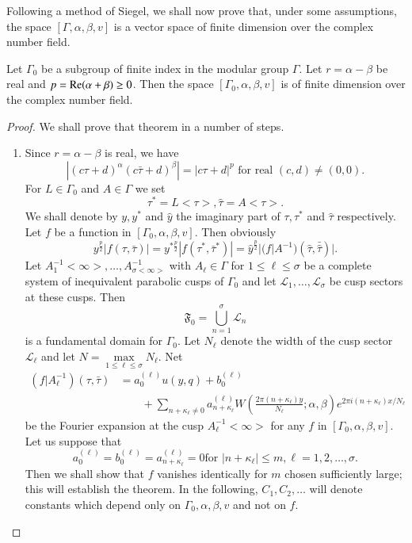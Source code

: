 Following a method of Siegel, we shall now prove that, under some
assumptions, the space $[\Gamma, \alpha, \beta, v]$ is a vector space
of finite dimension over the complex number field.

\setcounter{thm}{27}

\begin{thm}\label{chap4:thm28}
Let \pageoriginale $\Gamma_0$ be a subgroup of finite index in the
modular group $\Gamma$. Let $r=\alpha-\beta$ be real and
$p=\operatorname{Re}(\alpha+\beta)\geq 0$. Then the space $[\Gamma_0, \alpha,
  \beta,v]$ is of finite dimension over the complex number field.
\end{thm}

\begin{proof}
We shall prove that theorem in a number of steps.
\begin{enumerate}
\renewcommand{\labelenumi}{\theenumi)}
\item Since $r=\alpha-\beta$ is real, we have 
$$
|(c\tau+d)^{\alpha} (c\bar{\tau}+d)^{\beta}| = |c\tau+d|^p \text{ for
  real } (c,d) \neq (0,0).
$$
For $L\in \Gamma_0$ and $A\in \Gamma$ we set 
$$
\tau^{\ast} = L<\tau>, \hat{\tau} = A<\tau>.
$$
We shall denote by $y,y^{\ast}$ and $\hat{y}$ the imaginary part of
$\tau, \tau^{\ast}$ and $\hat{\tau}$ respectively. Let $f$ be a
function in $[\Gamma_0, \alpha, \beta, v]$. Then obviously
$$
y^{\frac{p}{2}} |f(\tau,\bar{\tau})| = y^{\ast\frac{p}{2}}
|f(\tau^{\ast}, \bar{\tau}^{\ast})| = \hat{y}^{\frac{p}{2}}
|(f|A^{-1})(\hat{\tau}, \bar{\hat{\tau}})|.
$$
Let $A^{-1}_1<\infty>, \ldots, A^{-1}_{\sigma<\infty>}$ with $A_{\ell}
\in \Gamma$ for $1 \leq \ell \leq \sigma$ be a complete system
of inequivalent parabolic cusps of $\Gamma_0$ and let $\mathscr{L}_1,
\ldots, \mathscr{L}_{\sigma}$ be cusp sectors at these cusps. Then
$$
\mathfrak{F}_0 = \bigcup^{\sigma}_{n=1} \mathscr{L}_n
$$
is a fundamental domain for $\Gamma_0$. Let $N_{\ell}$ denote the
width of the cusp sector $\mathscr{L}_{\ell}$ and let $N=\max\limits_{1\leq
  \ell \leq \sigma}N_{\ell}$. Net
\begin{align*}
(f|A^{-1}_{\ell})(\tau,\bar{\tau}) &= a^{(\ell)}_0 u(y,q) +
b^{(\ell)}_0\\
&\qquad + \sum_{n+\kappa_{\ell} \neq 0}
a^{(\ell)}_{n+\kappa_{\ell}} W
(\frac{2\pi(n+\kappa_{\ell})y}{N_{\ell}}; \alpha, \beta)e^{2\pi
  i(n+\kappa_{\ell})x/N_{\ell}} 
\end{align*}
be the Fourier expansion at the cusp $A^{-1}_{\ell}<\infty>$ for any
$f$ in $[\Gamma_0,\alpha, \beta,v]$.
Let \pageoriginale us suppose that
$$
a^{(\ell)}_0 = b^{(\ell)}_0 = a^{(\ell)}_{n+\kappa_{\ell}} = 0 \text{
  for } |n+\kappa_{\ell}| \leq m, \ell = 1, 2, \ldots, \sigma.
$$
Then we shall show that $f$ vanishes identically for $m$ chosen
sufficiently large; this will establish the theorem. In the following,
$C_1,C_2,\ldots$ will denote constants which depend only on $\Gamma_0,
\alpha, \beta, v$ and not on $f$.


\end{enumerate}
\end{proof}

